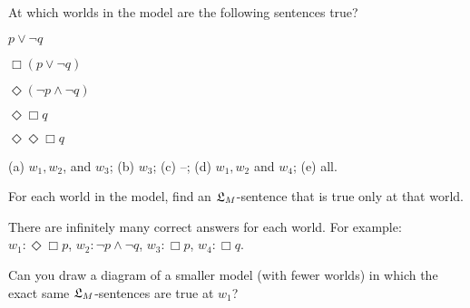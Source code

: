 \begin{exercise}
  At which worlds in the  model are the following sentences true?
  \begin{exlist}
  \item $p \lor \neg q$
  \item $\Box(p \lor \neg q)$
  \item $\Diamond(\neg p \land \neg q)$
  \item $\Diamond\Box q$
  \item $\Diamond\Diamond\Box q$
  \end{exlist}
\end{exercise}
\begin{solution}
  (a) $w_{1}, w_{2}$, and $w_{3}$; (b) $w_{3}$; (c) --; (d) $w_{1}, w_{2}$ and $w_{4}$; (e) all.
\end{solution}

\begin{exercise}
  For each world in the model, find an $\mathfrak{L}_M$-sentence that is true only at
  that world.
\end{exercise}
\begin{solution}
  There are infinitely many correct answers for each world. For
  example: $w_1: \Diamond\Box p$, $w_2: \neg p \land \neg q$,
  $w_3: \Box p$, $w_4: \Box q$.
\end{solution}

\begin{exercise}
  Can you draw a diagram of a smaller model (with fewer worlds) in
  which the exact same $\mathfrak{L}_M$-sentences are true at $w_1$?
\end{exercise}
\begin{solution}
\end{solution}


